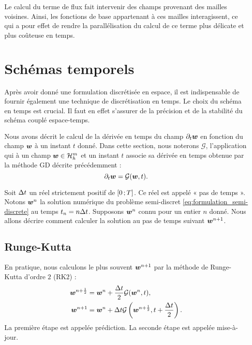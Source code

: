 \begin{remark}
	Le calcul du terme de flux fait intervenir des champs provenant des mailles
	voisines. Ainsi, les fonctions de base appartenant à ces mailles interagissent,
	ce qui a pour effet de rendre la parallélisation du calcul de ce terme plus
	délicate et plus coûteuse en temps.
	\\
\end{remark}



\section{Schémas temporels}
\label{sect:schemas_temporels}

Après avoir donné une formulation discrétisée en espace, il est indispensable
de fournir également une technique de discrétisation en temps. Le choix du
schéma en temps est crucial. Il faut en effet s’assurer de la précision et de la
stabilité du schéma couplé espace-temps.


Nous avons décrit le calcul de la dérivée en temps du champ $\partial_{t}\bm{w}$ en
fonction du champ $\bm{w}$ à un instant $t$ donné.
Dans cette section, nous noterons $\mathcal{G}$, l’application qui à un champ
$\bm{w} \in \mathcal{H}_h^m$ et un instant $t$ associe sa dérivée en temps
obtenue par la méthode GD décrite précédemment :
\begin{equation} \label{eq:operateur_gd}
	\partial_{t}\bm{w} = \mathcal{G}(\bm{w},t) .
\end{equation}


Soit $\Delta t$ un réel strictement positif de $\lbrack0\,;T\rbrack$. Ce réel est appelé
« pas de temps ». Notons $\bm{w}^n$ la solution numérique du problème
semi-discret \eqref{eq:formulation_semi-discrete} au temps $t_n = n \Delta t$. 
Supposons $\bm{w}^n$ connu pour un entier $n$ donné. Nous allons décrire comment calculer
la solution au pas de temps suivant $\bm{w}^{n+1}$.
\\

\subsection{Runge-Kutta}
\label{ssect:rk}

En pratique, nous calculons le plus souvent $\bm{w}^{n+1}$ par la méthode
de Runge-Kutta d’ordre $2$ (RK$2$) :
\begin{equation}
	\begin{aligned}
		\bm{w}^{n+\frac{1}{2}} &= \bm{w}^n
			+ \frac{\Delta t}{2} \mathcal{G}(\bm{w}^n,t) , \\
		\bm{w}^{n+1} &= \bm{w}^n
			+ \Delta t \mathcal{G}\left(\bm{w}^{n+\frac{1}{2}},t + \frac{\Delta t}{2}\right)
		\label{eq:methode_rk2} .
	\end{aligned}
\end{equation}
La première étape est appelée prédiction.
La seconde étape est appelée mise-à-jour.


